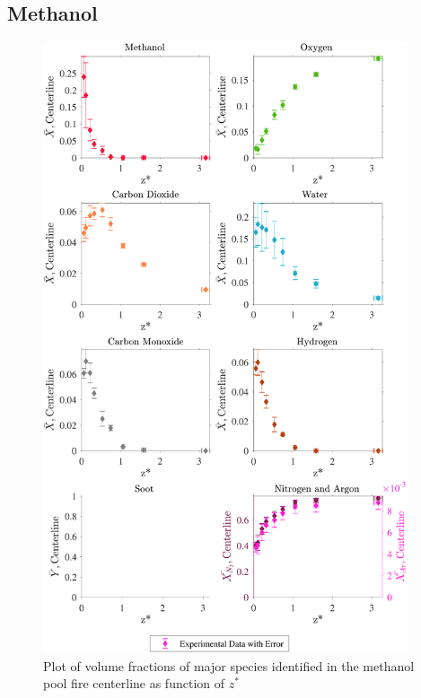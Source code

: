 \documentclass[12pt]{article}
\begin{document}
\subsection{Methanol}
\label{ssec:Methanol_ALL_Vol_Frac}
\begin{figure}[!h]
	\centering
\includegraphics[width=10.75cm,keepaspectratio]{Methanol_MOL_FRAC_Plot.pdf}
	\caption[Volume fractions of major species in the methanol plume]{Plot of volume fractions of major species identified in the methanol pool fire centerline as function of $z^{*}$}
	\label{fig:Methanol_VOL_Frac_Major}
\end{figure}
\pagebreak
\end{document}
